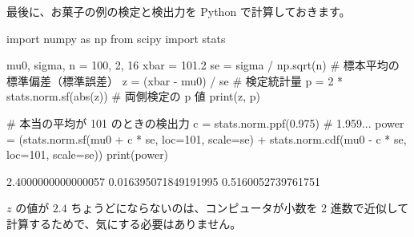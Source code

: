 最後に、お菓子の例の検定と検出力を Python で計算しておきます。

\begin{pycode}[平均の検定と検出力]
import numpy as np
from scipy import stats

mu0, sigma, n = 100, 2, 16
xbar = 101.2
se = sigma / np.sqrt(n)             # 標本平均の標準偏差（標準誤差）
z = (xbar - mu0) / se               # 検定統計量
p = 2 * stats.norm.sf(abs(z))       # 両側検定の p 値
print(z, p)

# 本当の平均が 101 のときの検出力
c = stats.norm.ppf(0.975)           # 1.959...
power = (stats.norm.sf(mu0 + c * se, loc=101, scale=se)
         + stats.norm.cdf(mu0 - c * se, loc=101, scale=se))
print(power)
\end{pycode}

\begin{pyoutput}
2.4000000000000057 0.016395071849191995
0.5160052739761751
\end{pyoutput}

$z$ の値が $2.4$ ちょうどにならないのは、コンピュータが小数を 2 進数で近似して計算するためで、気にする必要はありません。

